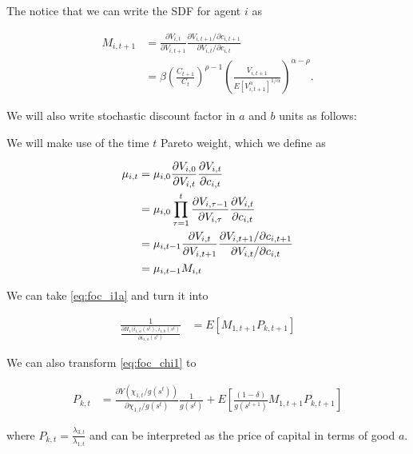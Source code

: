 \documentclass[19pt]{article}
\newcommand{\fracpd}[2]{
  \ensuremath{\frac{\partial #1}{\partial #2}}
}
\begin{document}
The notice that we can write the SDF for agent $i$ as

\begin{align*}
  M_{i,t+1} &= \fracpd{V_{i,t}}{V_{i,t+1}} \frac{\partial V_{i,t+1}/ \partial c_{i,t+1}}{\partial V_{i,t}/ \partial c_{i,t}} \\
  &= \beta \left( \frac{C_{t+1}}{C_t} \right)^{\rho - 1} \left( \frac{V_{i,t+1}}{E \left[ V_{i,t+1}^{\alpha} \right]^{1/\alpha}} \right)^{\alpha-\rho}.
\end{align*}

We will also write stochastic discount factor in $a$ and $b$ units as follows:



We will make use of the time $t$ Pareto weight, which we define as

\begin{align} \label{eq:defn_pareto_weight}
  \mu_{i,t} &= \mu_{i,0} \fracpd{V_{i,0}}{V_{i,t}} \fracpd{V_{i,t}}{c_{i,t}} \notag \\
  &= \mu_{i,0} \prod_{\tau=1}^{t} \fracpd{V_{i,\tau-1}}{V_{i,\tau}} \fracpd{V_{i,t}}{c_{i,t}} \notag  \\
  &= \mu_{i,t-1} \fracpd{V_{i,t}}{V_{i,t+1}} \frac{\partial V_{i,t+1}/ \partial c_{i,t+1}}{\partial V_{i,t}/ \partial c_{i,t}} \notag \\
  &= \mu_{i, t-1} M_{i,t}
\end{align}

We can take \eqref{eq:foc_i1a} and turn it into

\begin{align*}
  \frac{1}{\fracpd{H_1(i_{1, a}(s^t), i_{1, b}(s^t)}{i_{1, a}(s^t)}} &= E \left[ M_{1, t+1} P_{k, t+1} \right]
\end{align*}

We can also transform \eqref{eq:foc_chi1} to

\begin{align*}
  P_{k, t} &= \fracpd{Y(\chi_{1, t} / g(s^t))}{\chi_{1, t} / g(s^t)} \frac{1}{g(s^t)} + E \left[ \frac{(1 - \delta)}{g(s^{t+1})} M_{1, t+1} P_{k, t+1} \right]
\end{align*}

where $P_{k, t} = \frac{\lambda_{3, t}}{\lambda_{1, t}}$ and can be interpreted as the price of capital in terms of good $a$.
\end{document}
